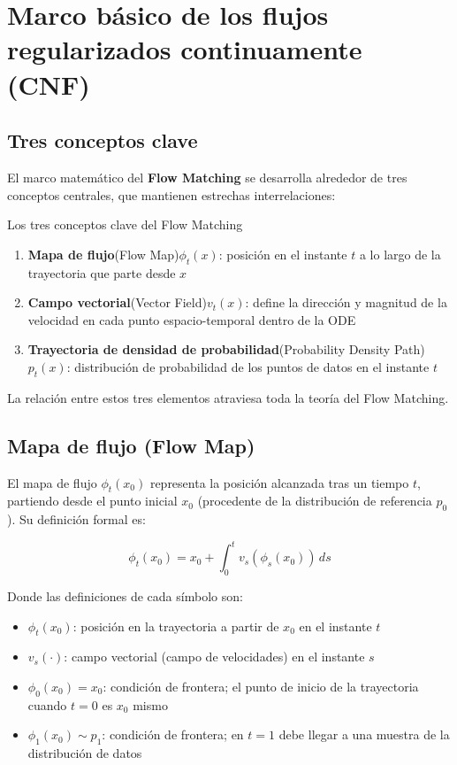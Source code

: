 \section{Marco básico de los flujos regularizados continuamente (CNF)}

\subsection{Tres conceptos clave}

El marco matemático del \textbf{Flow Matching} se desarrolla alrededor de tres conceptos centrales, que mantienen estrechas interrelaciones:

\begin{importantbox}{Los tres conceptos clave del Flow Matching}
\begin{enumerate}
    \item \textbf{Mapa de flujo}(Flow Map)$\phi_t(x)$: posición en el instante $t$ a lo largo de la trayectoria que parte desde $x$
    \item \textbf{Campo vectorial}(Vector Field)$v_t(x)$: define la dirección y magnitud de la velocidad en cada punto espacio-temporal dentro de la ODE
    \item \textbf{Trayectoria de densidad de probabilidad}(Probability Density Path)$p_t(x)$: distribución de probabilidad de los puntos de datos en el instante $t$
\end{enumerate}
La relación entre estos tres elementos atraviesa toda la teoría del Flow Matching.
\end{importantbox}

\subsection{Mapa de flujo (Flow Map)}

El mapa de flujo $\phi_t(x_0)$ representa la posición alcanzada tras un tiempo $t$, partiendo desde el punto inicial $x_0$ (procedente de la distribución de referencia $p_0$). Su definición formal es:

$$\phi_t(x_0) = x_0 + \int_0^t v_s(\phi_s(x_0)) \, ds$$

Donde las definiciones de cada símbolo son:
\begin{itemize}
    \item $\phi_t(x_0)$: posición en la trayectoria a partir de $x_0$ en el instante $t$
    \item $v_s(\cdot)$: campo vectorial (campo de velocidades) en el instante $s$
    \item $\phi_0(x_0) = x_0$: condición de frontera; el punto de inicio de la trayectoria cuando $t=0$ es $x_0$ mismo
    \item $\phi_1(x_0) \sim p_1$: condición de frontera; en $t=1$ debe llegar a una muestra de la distribución de datos
\end{itemize}

